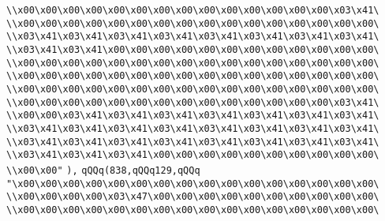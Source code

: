 \verb|\\x00\x00\x00\x00\x00\x00\x00\x00\x00\x00\x00\x00\x00\x00\x03\x41\|\newline
\verb|\\x00\x00\x00\x00\x00\x00\x00\x00\x00\x00\x00\x00\x00\x00\x00\x00\|\newline
\verb|\\x03\x41\x03\x41\x03\x41\x03\x41\x03\x41\x03\x41\x03\x41\x03\x41\|\newline
\verb|\\x03\x41\x03\x41\x00\x00\x00\x00\x00\x00\x00\x00\x00\x00\x00\x00\|\newline
\verb|\\x00\x00\x00\x00\x00\x00\x00\x00\x00\x00\x00\x00\x00\x00\x00\x00\|\newline
\verb|\\x00\x00\x00\x00\x00\x00\x00\x00\x00\x00\x00\x00\x00\x00\x00\x00\|\newline
\verb|\\x00\x00\x00\x00\x00\x00\x00\x00\x00\x00\x00\x00\x00\x00\x00\x00\|\newline
\verb|\\x00\x00\x00\x00\x00\x00\x00\x00\x00\x00\x00\x00\x00\x00\x03\x41\|\newline
\verb|\\x00\x00\x03\x41\x03\x41\x03\x41\x03\x41\x03\x41\x03\x41\x03\x41\|\newline
\verb|\\x03\x41\x03\x41\x03\x41\x03\x41\x03\x41\x03\x41\x03\x41\x03\x41\|\newline
\verb|\\x03\x41\x03\x41\x03\x41\x03\x41\x03\x41\x03\x41\x03\x41\x03\x41\|\newline
\verb|\\x03\x41\x03\x41\x03\x41\x00\x00\x00\x00\x00\x00\x00\x00\x00\x00\|\newline
\verb|\\x00\x00"|\newline
\verb|),|\newline
\verb|qQQq(838,qQQq129,qQQq|\newline
\verb|"\x00\x00\x00\x00\x00\x00\x00\x00\x00\x00\x00\x00\x00\x00\x00\x00\|\newline
\verb|\\x00\x00\x00\x00\x03\x47\x00\x00\x00\x00\x00\x00\x00\x00\x00\x00\|\newline
\verb|\\x00\x00\x00\x00\x00\x00\x00\x00\x00\x00\x00\x00\x00\x00\x00\x00\|\newline
